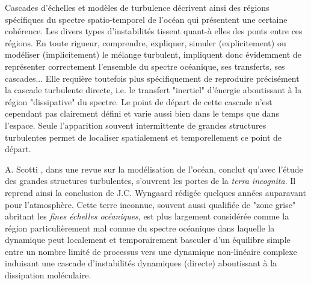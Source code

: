 Cascades d'échelles et modèles de turbulence décrivent ainsi des régions spécifiques du spectre spatio-temporel de l'océan qui présentent une certaine cohérence. Les divers types d'instabilités tissent quant-à elles des ponts entre ces régions. En toute rigueur, comprendre, expliquer, simuler (explicitement) ou modéliser (implicitement) le mélange turbulent, impliquent donc évidemment de représenter correctement l'ensemble du spectre océanique, ses transferts, ses cascades... Elle requière toutefois plus spécifiquement de reproduire précisément la cascade turbulente directe, i.e. le transfert "inertiel" d'énergie aboutissant à la région "dissipative" du spectre. Le point de départ de cette cascade n'est cependant pas clairement défini et varie aussi bien dans le temps que dans l'espace. Seule l'apparition souvent intermittente de grandes structures turbulentes permet de localiser spatialement et temporellement ce point de départ.

A. Scotti \citep{scotti_large_2010}, dans une revue sur la modélisation de l'océan, conclut qu’avec l'étude des grandes structures turbulentes, s'ouvrent les portes de la \textit{terra incognita}. Il reprend ainsi la conclusion de J.C. Wyngaard \citep{wyngaard_toward_2004} rédigée quelques années auparavant pour l'atmosphère. Cette terre inconnue, souvent aussi qualifiée de "zone grise" abritant les \textit{fines échelles océaniques}, est plus largement considérée comme la région particulièrement mal connue du spectre océanique dans laquelle la dynamique peut localement et temporairement basculer d'un équilibre simple entre un nombre limité de processus vers une dynamique non-linéaire complexe induisant une cascade d'instabilités dynamiques (directe) aboutissant à la dissipation moléculaire. 
\color{black}
\color{blue}
